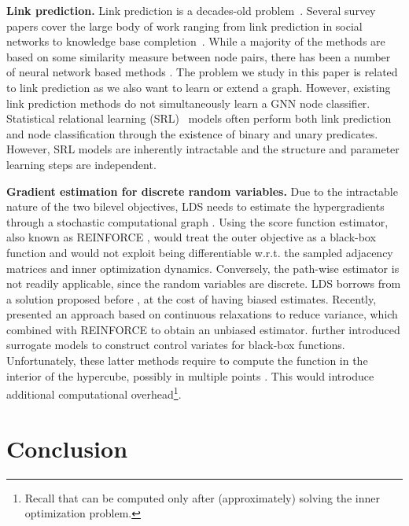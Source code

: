\documentclass{article}
\newcommand{\lds}{\textsc{LDS}\xspace}
\begin{document}
\textbf{Link prediction.} Link prediction is a decades-old problem~\citep{liben2007link}. Several survey papers cover the large body of work ranging from link prediction in social networks to knowledge base completion~\citep{lu2011link,nickel2016review}. While a majority of the methods are based on some similarity measure between node pairs, there has been a number of neural network based methods \citep{zhang2017weisfeiler,zhang2018link}. The problem we study in this paper is related to link prediction as we also want to learn or extend a graph. 
However, existing link prediction methods do not simultaneously learn a GNN node classifier.
Statistical relational learning (SRL)~\citep{getoor2007introduction} models often perform both link prediction and node classification through the existence of binary and unary predicates. However, SRL models are inherently intractable and the structure  and parameter learning steps are  independent.


\textbf{Gradient estimation for discrete random variables.} Due to the intractable nature of the two bilevel objectives, \lds needs to estimate the hypergradients through a stochastic computational graph \citep{schulman2015gradient}. 
Using the score function estimator, also known as REINFORCE \citep{williams1992simple}, would treat the outer objective as a black-box function and would not exploit  being differentiable w.r.t. the sampled adjacency matrices and inner optimization dynamics. Conversely, the path-wise estimator is not readily applicable, since the random variables are discrete. \lds borrows from a solution proposed before \citep{bengio2013estimating}, at the cost of having biased estimates. Recently, \citet{jang2016categorical, maddison2016concrete} presented an approach based on  continuous relaxations to reduce variance, which    \citet{tucker2017rebar} combined with REINFORCE to obtain an unbiased estimator.  \citet{grathwohl2017backpropagation} further introduced surrogate models to construct control variates for black-box functions. Unfortunately, these latter methods require to compute the function in the interior of the hypercube, possibly in multiple points \citep{tucker2017rebar}. This would introduce additional computational overhead\footnote{Recall that  can be computed only after (approximately) solving the inner optimization problem.}. 









\section{Conclusion}
\end{document}
